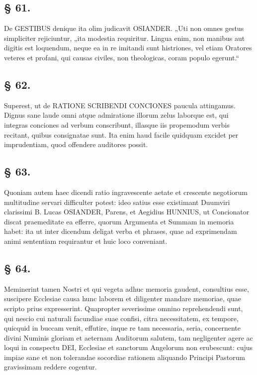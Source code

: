 \subsection*{§ 61.}

De GESTIBUS denique ita olim judicavit OSIANDER. „Uti non omnes gestus simpliciter rejiciuntur, „ita modestia requiritur. Lingua enim, non manibus aut digitis est loquendum, neque ea in re imitandi sunt histriones, vel etiam Oratores veteres et profani, qui causas civiles, non theologicas, coram populo egerunt.“

\subsection*{§ 62.}

Superest, ut de RATIONE SCRIBENDI CONCIONES paucula attingamus. Dignus sane laude omni atque admiratione illorum zelus laborque est, qui integras conciones ad verbum conscribunt, illasque iis propemodum verbis recitant, quibus consignatae sunt. Ita enim haud facile quidquam excidet per imprudentiam, quod offendere auditores possit.

\subsection*{§ 63.}

Quoniam autem haec dicendi ratio ingravescente aetate et crescente negotiorum multitudine servari difficulter potest: ideo satius esse existimant Duumviri clarissimi B. Lucas OSIANDER, Parens, et Aegidius HUNNIUS, ut Concionator discat praemeditate ea efferre, quorum Argumenta et Summam in memoria habet: ita ut inter dicendum deligat verba et phrases, quae ad exprimendam animi sententiam requirantur et huic loco conveniant.

\subsection*{§ 64.}

Meminerint tamen Nostri et qui vegeta adhuc memoria gaudent, consultius esse, suscipere Ecclesiae causa hunc laborem et diligenter mandare memoriae, quae scripto prius expresserint. Quapropter severissime
omnino reprehendendi sunt, qui nescio cui naturali facundiae suae confisi, citra necessitatem, ex tempore, quicquid in buccam venit, effutire, inque re tam necessaria, seria, concernente divini Numinis gloriam et aeternam Auditorum salutem, tam negligenter agere ac loqui in conspectu DEI, Ecclesiae et sanctorum Angelorum non erubescunt: cujus impiae sane et non tolerandae socordiae rationem aliquando Principi Pastorum gravissimam reddere cogentur.

